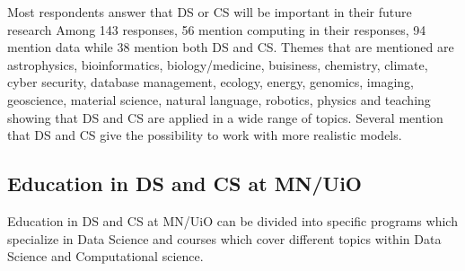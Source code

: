 \documentclass[a4paper,10pt]{article}
\begin{document}
Most respondents answer that DS or CS will be important in their future research
Among 143 responses, 56 mention computing in their responses, 94 mention data while 38 mention both DS and CS.
Themes that are mentioned are astrophysics, bioinformatics, biology/medicine, buisiness, chemistry, climate, cyber security, 
database management, ecology, energy,  genomics, imaging, geoscience, material science, natural language, robotics,
physics and teaching showing that DS and CS are applied
in a wide range of topics. 
Several mention that DS and CS give the possibility to work with more realistic models.


\subsection{Education in DS and CS at MN/UiO}

Education in DS and CS at MN/UiO can be divided into specific programs which specialize in Data Science and courses which cover different topics within Data Science and Computational science. 
\end{document}
